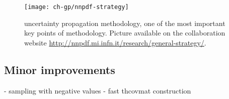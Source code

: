 

\begin{figure}
	\centering
	\texttt{[image: ch-gp/nnpdf-strategy]}
	\caption{
    \nnpdf uncertainty propagation methodology, one of the most important key
    points of \nnpdf methodology.
    Picture available on the collaboration website
    \url{http://nnpdf.mi.infn.it/research/general-strategy/}.
	}
	\label{fig:gp/nnpdf}
\end{figure}

\subsection{Minor improvements}

- sampling with negative values
- fast thcovmat construction
